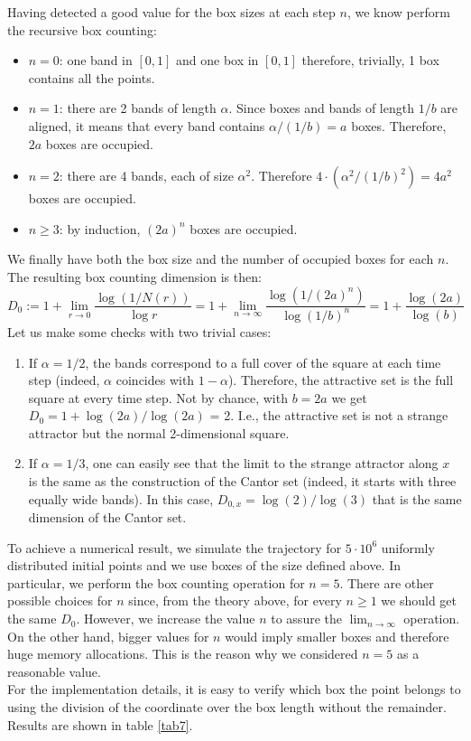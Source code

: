 \documentclass[11pt,titlepage]{article}
\begin{document}
Having detected a good value for the box sizes at each step $n$, we know perform the recursive box counting:
\begin{itemize}
	\item $n=0$: one band in $[0,1]$ and one box in $[0,1]$ therefore, trivially, 1 box contains all the points.
	\item $n=1$: there are 2 bands of length $\alpha$. Since boxes and bands of length $1/b$ are aligned, it means that every band contains $\alpha/(1/b) = a$ boxes. Therefore, $2a$ boxes are occupied.
	\item $n=2$: there are 4 bands, each of size $\alpha^2$. Therefore $4 \cdot (\alpha^2 / (1/b)^2) = 4a^2$ boxes are occupied.
	\item $n \ge 3$: by induction, $(2a)^n$ boxes are occupied.
\end{itemize}
We finally have both the box size and the number of occupied boxes for each $n$. The resulting box counting dimension is then:
\begin{equation*}
	D_0 := 1 + \lim_{r\rightarrow 0}\frac{\log(1/N(r))}{\log{r}} = 1 + \lim_{n\rightarrow \infty}\frac{\log(1/(2a)^n)}{\log{(1/b)^n}} = 1 + \frac{\log(2a)}{\log(b)}
\end{equation*}
Let us make some checks with two trivial cases:
 \begin{enumerate}
 	\item If $\alpha=1/2$, the bands correspond to a full cover of the square at each time step (indeed, $\alpha$ coincides with $1-\alpha$). Therefore, the attractive set is the full square at every time step. Not by chance, with $b=2a$ we get $D_0 = 1 + \log(2a)/\log(2a)$ = 2. I.e., the attractive set is not a strange attractor but the normal 2-dimensional square. 
 	\item If $\alpha=1/3$, one can easily see that the limit to the strange attractor along $x$ is the same as the construction of the Cantor set (indeed, it starts with three equally wide bands). In this case, $D_{0,x} = \log(2)/\log(3)$ that is the same dimension of the Cantor set.
 \end{enumerate}
To achieve a numerical result, we simulate the trajectory for $5\cdot 10^6$ uniformly distributed initial points and we use boxes of the size defined above. In particular, we perform the box counting operation for $n=5$. There are other possible choices for $n$ since, from the theory above, for every $n \geq 1 $ we should get the same $D_0$. However, we increase the value $n$ to assure the $\lim_{n\rightarrow \infty}$ operation. On the other hand, bigger values for $n$ would imply smaller boxes and therefore huge memory allocations. This is the reason why we considered $n=5$ as a reasonable value. \\
For the implementation details, it is easy to verify which box the point belongs to using the division of the coordinate over the box length without the remainder. Results are shown in table \ref{tab7}.
\end{document}
